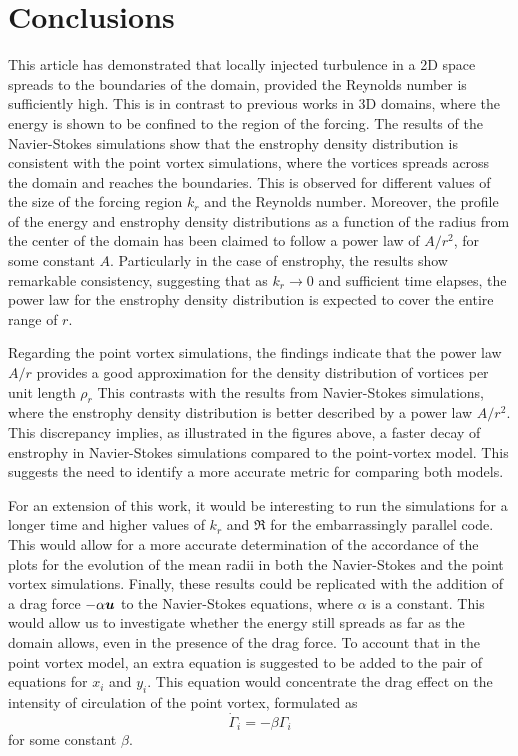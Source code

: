 \documentclass[../main.tex]{subfiles}
\begin{document}
\section{Conclusions}\label{sec:conclusions}
This article has demonstrated that locally injected turbulence in a 2D space spreads to the boundaries of the domain, provided the Reynolds number is sufficiently high. This is in contrast to previous works in 3D domains, where the energy is shown to be confined to the region of the forcing. The results of the Navier-Stokes simulations show that the enstrophy density distribution is consistent with the point vortex simulations, where the vortices spreads across the domain and reaches the boundaries. This is observed for different values of the size of the forcing region $k_r$ and the Reynolds number. Moreover, the profile of the energy and enstrophy density distributions as a function of the radius from the center of the domain has been claimed to follow a power law of $A/r^2$, for some constant $A$. Particularly in the case of enstrophy, the results show remarkable consistency, suggesting that as $k_r\to 0$ and sufficient time elapses, the power law for the enstrophy density distribution is expected to cover the entire range of $r$.

Regarding the point vortex simulations, the findings indicate that the power law $A/r$ provides a good approximation for the density distribution of vortices per unit length $\rho_r$ This contrasts with the results from Navier-Stokes simulations, where the enstrophy density distribution is better described by a power law $A/r^2$. This discrepancy implies, as illustrated in the figures above, a faster decay of enstrophy in Navier-Stokes simulations compared to the point-vortex model. This suggests the need to identify a more accurate metric for comparing both models.

For an extension of this work, it would be interesting to run the simulations for a longer time and higher values of $k_r$ and $\Re$ for the embarrassingly parallel code. This would allow for a more accurate determination of the accordance of the plots for the evolution of the mean radii in both the Navier-Stokes and the point vortex simulations.
Finally, these results could be replicated with the addition of a drag force $-\alpha \boldsymbol{u}$ to the Navier-Stokes equations, where $\alpha$ is a constant. This would allow us to investigate whether the energy still spreads as far as the domain allows, even in the presence of the drag force. To account that in the point vortex model, an extra equation is suggested to be added to the pair of equations for $x_i$ and $y_i$. This equation would concentrate the drag effect on the intensity of circulation of the point vortex, formulated as
\begin{equation}
	\dot{\Gamma}_i = -\beta \Gamma_i
\end{equation}
for some constant $\beta$.
\end{document}
